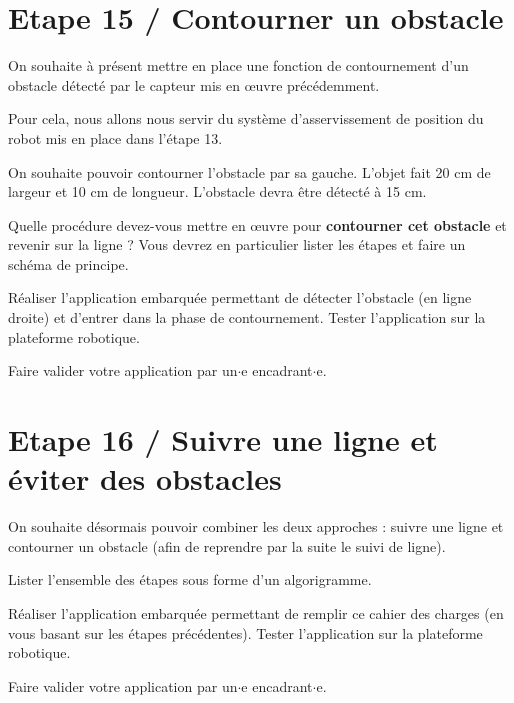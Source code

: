 \documentclass[a4paper,12pt,titlepage]{article} %
\begin{document}
\section{Etape 15 / Contourner un obstacle}

On souhaite à présent mettre en place une fonction de contournement d'un obstacle détecté par le capteur mis en \oe{}uvre précédemment.

Pour cela, nous allons nous servir du système d'asservissement de position du robot mis en place dans l'étape 13.

On souhaite pouvoir contourner l'obstacle par sa gauche. L'objet fait 20 cm de largeur et 10 cm de longueur. L'obstacle devra être détecté à 15 cm.

\Quest Quelle procédure devez-vous mettre en \oe{}uvre pour \textbf{contourner cet obstacle} et revenir sur la ligne ? Vous devrez en particulier lister les étapes et faire un schéma de principe.


\Manip Réaliser l'application embarquée permettant de détecter l'obstacle (en ligne droite) et d'entrer dans la phase de contournement. Tester l'application sur la plateforme robotique.



\begin{mdframed}[style=sidebar,frametitle={}]
\large
Faire valider votre application par un$\cdot$e encadrant$\cdot$e.
\end{mdframed}



\section{Etape 16 / Suivre une ligne et éviter des obstacles}

On souhaite désormais pouvoir combiner les deux approches : suivre une ligne et contourner un obstacle (afin de reprendre par la suite le suivi de ligne).

\Quest Lister l'ensemble des étapes sous forme d'un algorigramme.

\Manip Réaliser l'application embarquée permettant de remplir ce cahier des charges (en vous basant sur les étapes précédentes). Tester l'application sur la plateforme robotique.


\begin{mdframed}[style=sidebar,frametitle={}]
\large
Faire valider votre application par un$\cdot$e encadrant$\cdot$e.
\end{mdframed}
\end{document}
